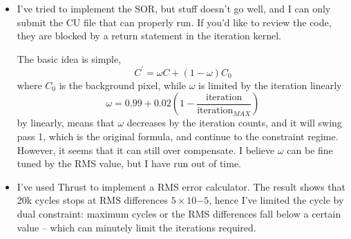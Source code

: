 \documentclass[12pt]{article}
\begin{document}
\begin{itemize}
\item 
I've tried to implement the SOR, but stuff doesn't go well, and I can only submit the CU file that can properly run. If you'd like to review the code, they are blocked by a return statement in the iteration kernel.

The basic idea is simple, 
\begin{equation*}
	C^\prime = \omega C + (1-\omega) C_0
\end{equation*}
where $C_0$ is the background pixel, while $\omega$ is limited by the iteration linearly
\begin{equation*}
	\omega = 0.99 + 0.02 (1-\frac{\text{iteration}}{\text{iteration}_{MAX}})
\end{equation*}
by linearly, means that $\omega$ decreases by the iteration counts, and it will swing pass 1, which is the original formula, and continue to the constraint regime.
However, it seems that it can still over compensate.
I believe $\omega$ can be fine tuned by the RMS value, but I have run out of time.

\item
I've used Thrust to implement a RMS error calculator. The result shows that 20k cycles stops at RMS differences $5 \times 10{-5}$, hence I've limited the cycle by dual constraint: maximum cycles or the RMS differences fall below a certain value -- which can minutely limit the iterations required. 
\end{itemize}
\end{document}
